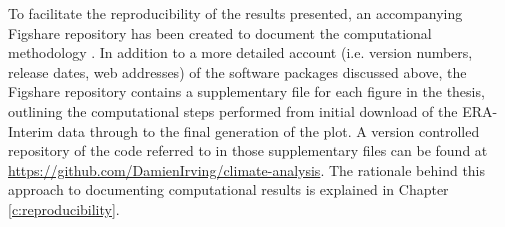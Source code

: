 To facilitate the reproducibility of the results presented, an accompanying Figshare repository has been created to document the computational methodology \citep{IrvingFigshare2016}. In addition to a more detailed account (i.e. version numbers, release dates, web addresses) of the software packages discussed above, the Figshare repository contains a supplementary file for each figure in the thesis, outlining the computational steps performed from initial download of the ERA-Interim data through to the final generation of the plot. A version controlled repository of the code referred to in those supplementary files can be found at \url{https://github.com/DamienIrving/climate-analysis}. The rationale behind this approach to documenting computational results is explained in Chapter \ref{c:reproducibility}.